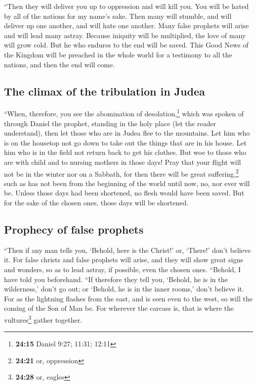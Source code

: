  ``Then they will deliver you up to oppression and will
kill you. You will be hated by all of the nations for my name's sake.
 Then many will stumble, and will deliver up one another,
and will hate one another.  Many false prophets will
arise and will lead many astray.  Because iniquity will
be multiplied, the love of many will grow cold.  But he
who endures to the end will be saved.  This Good News of
the Kingdom will be preached in the whole world for a testimony to all
the nations, and then the end will come.

\hypertarget{the-climax-of-the-tribulation-in-judea}{%
\subsection{The climax of the tribulation in
Judea}\label{the-climax-of-the-tribulation-in-judea}}

 ``When, therefore, you see the abomination of
desolation,\footnote{\textbf{24:15} Daniel 9:27; 11:31; 12:11} which was
spoken of through Daniel the prophet, standing in the holy place (let
the reader understand),  then let those who are in Judea
flee to the mountains.  Let him who is on the housetop
not go down to take out the things that are in his house.
 Let him who is in the field not return back to get his
clothes.  But woe to those who are with child and to
nursing mothers in those days!  Pray that your flight
will not be in the winter nor on a Sabbath,  for then
there will be great suffering,\footnote{\textbf{24:21} or, oppression}
such as has not been from the beginning of the world until now, no, nor
ever will be.  Unless those days had been shortened, no
flesh would have been saved. But for the sake of the chosen ones, those
days will be shortened.

\hypertarget{prophecy-of-false-prophets}{%
\subsection{Prophecy of false
prophets}\label{prophecy-of-false-prophets}}

 ``Then if any man tells you, `Behold, here is the
Christ!' or, `There!' don't believe it.  For false
christs and false prophets will arise, and they will show great signs
and wonders, so as to lead astray, if possible, even the chosen ones.
 ``Behold, I have told you beforehand. 
``If therefore they tell you, `Behold, he is in the wilderness,' don't
go out; or `Behold, he is in the inner rooms,' don't believe it.
 For as the lightning flashes from the east, and is seen
even to the west, so will the coming of the Son of Man be.
 For wherever the carcass is, that is where the
vultures\footnote{\textbf{24:28} or, eagles} gather together.

